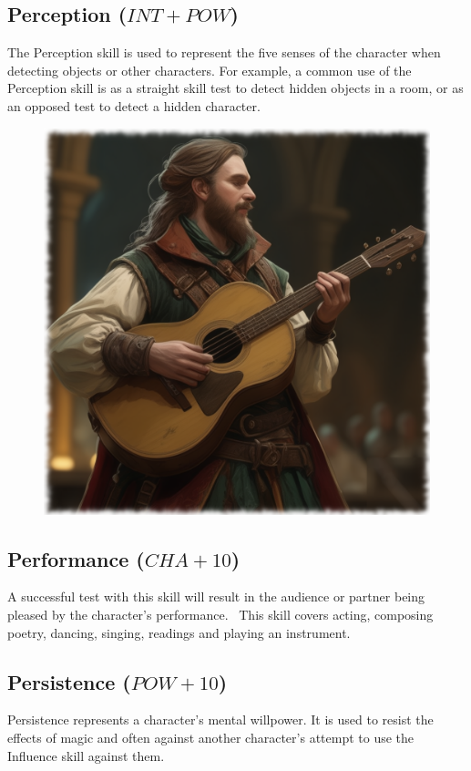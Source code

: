 \subsection{Perception ($INT+POW$)}
The Perception skill is used to represent the five senses of the character when detecting objects or other characters. For example, a common use of the Perception skill is as a straight skill test to detect hidden objects in a room, or as an opposed test to detect a hidden character.

\begin{figure}[h]
\begin{center}
\includegraphics[scale=0.24]{img/ai-images/bard.png}
\end{center}
\end{figure}

\subsection{Performance ($CHA+10$)}
A successful test with this skill will result in the audience or partner being pleased by the character’s performance.  This skill covers acting, composing poetry, dancing, singing, readings and playing an instrument. 

\subsection{Persistence ($POW+10$)}
Persistence represents a character’s mental willpower. It is used to resist the effects of magic and often against another character’s attempt to use the Influence skill against them.  


